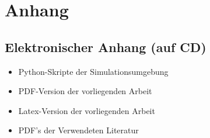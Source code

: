 % 

\chapter{Anhang}
\label{chap:Anhang}

\section{Elektronischer Anhang (auf CD)}

\begin{itemize}
	\item Python-Skripte der Simulationsumgebung
	\item PDF-Version der vorliegenden Arbeit
	\item Latex-Version der vorliegenden Arbeit
	\item PDF's der Verwendeten Literatur 
\end{itemize}